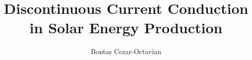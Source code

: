 \documentclass[a4paper,11pt]{scrreprt}                       %
\def \chapters {./chapters}      														 %
\begin{document}

\title{Discontinuous Current Conduction in Solar Energy Production}					    %
\author{Bontaș Cezar-Octavian}																				%

\maketitle


\tableofcontents
\printnoidxglossaries																				%
\listoffigures
{}
\listoftables
{}
\listofalgorithmes
{}

\clearpage








\appendix
\appendixpage
\addappheadtotoc
\begin{appendices}																				  %
    
\end{appendices}

\cleardoublepage

\printbibliography[heading=bibintoc]
\end{document}
